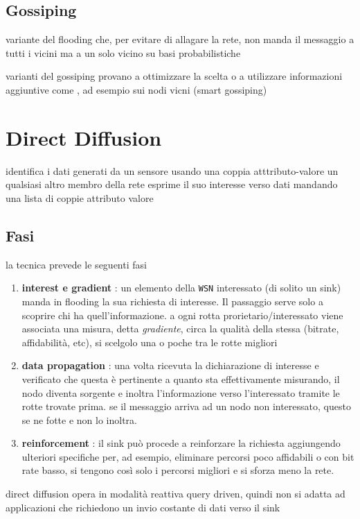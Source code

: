 \documentclass[11pt]{article}
\begin{document}
\subsection{Gossiping}
\label{sec:orgc641552}
variante del flooding che, per evitare di allagare la rete, non manda il messaggio a tutti i vicini ma a un solo vicino su basi probabilistiche

varianti del gossiping provano a ottimizzare la scelta o a utilizzare informazioni aggiuntive come , ad esempio sui nodi vicni (smart gossiping)

\section{Direct Diffusion}
\label{sec:org7a5f1f1}
identifica i dati generati da un sensore usando una coppia atttributo-valore
un qualsiasi altro membro della rete esprime il suo interesse verso dati mandando una lista di coppie attributo valore

\subsection{Fasi}
\label{sec:orgc5b6af2}
la tecnica prevede le seguenti fasi
\begin{enumerate}
\item \textbf{interest e gradient} : un elemento della \texttt{WSN} interessato (di solito un sink) manda in flooding la sua richiesta di interesse.
Il passaggio serve solo a scoprire chi ha quell'informazione.
a ogni rotta prorietario/interessato viene associata una misura, detta \emph{gradiente}, circa la qualità della stessa (bitrate, affidabilità, etc), si scelgolo una o poche tra le rotte migliori
\item \textbf{data propagation} : una volta ricevuta la dichiarazione di interesse e verificato che questa è pertinente a quanto sta effettivamente misurando, il nodo diventa sorgente e inoltra l'informazione verso l'interessato tramite le rotte trovate prima.
se il messaggio arriva ad un nodo non interessato, questo se ne fotte e non lo inoltra.
\item \textbf{reinforcement} : il sink può procede a reinforzare la richiesta aggiungendo ulteriori specifiche per, ad esempio, eliminare percorsi poco affidabili o con bit rate basso, si tengono così solo i percorsi migliori e si sforza meno la rete.
\end{enumerate}

direct diffusion opera in modalità reattiva query driven, quindi non si adatta ad applicazioni che richiedono un invio costante di dati verso il sink    
\end{document}
